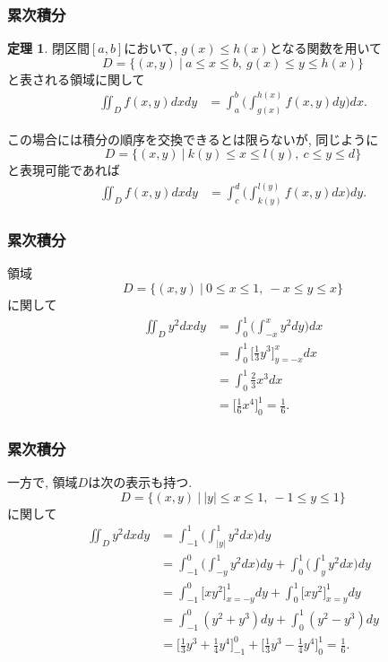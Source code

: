 \documentclass[dvipdfmx,cjk,10.2pt]{beamer}
\theoremstyle{definition}
\newtheorem{Thm}{定理}[section]
\begin{document}
\begin{frame}
\frametitle{累次積分}

\vspace{-2mm}

\begin{Thm}
閉区間$[a,b]$において, $g(x) \le h(x)$となる関数を用いて
$$
D=\{(x,y) \ | \ a \le x \le b, \ g(x) \le y \le h(x)\}
$$
と表される領域に関して
\begin{align*}
\iint_Df(x,y)dxdy &= \int_a^b\big( \int_{g(x)}^{h(x)} f(x,y)dy\big)dx. 
\end{align*}
\end{Thm}
この場合には積分の順序を交換できるとは限らないが, 同じように
$$
D=\{(x,y) \ | \ k(y) \le x \le l(y), \ c \le y \le d\}
$$
と表現可能であれば
\begin{align*}
\iint_Df(x,y)dxdy &= \int_c^d\big( \int_{k(y)}^{l(y)} f(x,y)dx\big)dy. 
\end{align*}
\end{frame}





\begin{frame}
\frametitle{累次積分}


領域
$$
D=\{(x,y) \ | \ 0 \le x \le 1, \ -x\le y \le x\}
$$
に関して
\begin{align*}
\iint_Dy^2 dxdy &= \int_0^1\big( \int_{-x}^x y^2dy\big)dx \\
 & = \int_0^1\big[\frac{1}{3}y^3\big]_{y=-x}^xdx\\
& = \int_0^1 \frac{2}{3}x^3dx \\
&  = \big[ \frac{1}{6} x^4 \big]_0^1=\frac{1}{6}. 
\end{align*}

\end{frame}





\begin{frame}
\frametitle{累次積分}


一方で, 領域$D$は次の表示も持つ. 
$$
D=\{(x,y) \ | \ |y| \le x \le 1, \ -1 \le y \le 1\}
$$
に関して
\begin{align*}
\iint_Dy^2 dxdy &= \int_{-1}^1\big( \int_{|y|}^1 y^2dx\big)dy \\
&= \int_{-1}^0\big( \int_{-y}^1 y^2dx\big)dy + \int_{0}^1\big( \int_{y}^1 y^2dx\big)dy \\
 & = \int_{-1}^0 \big[xy^2\big]_{x=-y}^1dy + \int_{0}^1 \big[xy^2\big]_{x=y}^1dy \\
 & = \int_{-1}^0 (y^2+y^3)dy + \int_{0}^1 (y^2-y^3)dy \\
&  = \big[ \frac{1}{3}y^3+\frac{1}{4}y^4\big]_{-1}^0 + \big[ \frac{1}{3}y^3-\frac{1}{4}y^4\big]_{0}^1=\frac{1}{6}. 
\end{align*}

\end{frame}
\end{document}
